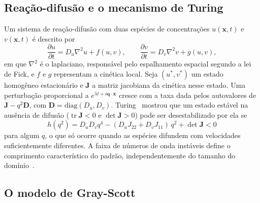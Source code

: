 \documentclass[final,5p,times,twocolumn]{elsarticle}
\begin{document}
\subsection{Reação-difusão e o mecanismo de Turing}\label{subsec:turing}

Um sistema de reação-difusão com duas espécies de concentrações $u(\mathbf{x},t)$ e $v(\mathbf{x},t)$ é descrito por
\begin{equation}\label{eq:rd}
\frac{\partial u}{\partial t} = D_u \nabla^2 u + f(u,v), \qquad
\frac{\partial v}{\partial t} = D_v \nabla^2 v + g(u,v),
\end{equation}
em que $\nabla^2$ é o laplaciano, responsável pelo espalhamento espacial segundo a lei de Fick, e $f$ e $g$ representam a cinética local. Seja $(u^*,v^*)$ um estado homogêneo estacionário e $\mathbf{J}$ a matriz jacobiana da cinética nesse estado. Uma perturbação proporcional a $e^{\lambda t+i\mathbf{q}\cdot\mathbf{x}}$ cresce com a taxa dada pelos autovalores de $\mathbf{J}-q^2\mathbf{D}$, com $\mathbf{D}=\mathrm{diag}(D_u,D_v)$. Turing~\cite{turing1952} mostrou que um estado estável na ausência de difusão ($\operatorname{tr}\mathbf{J}<0$ e $\det\mathbf{J}>0$) pode ser desestabilizado por ela se
\begin{equation}\label{eq:turing}
h(q^2)=D_uD_v q^4-(D_u J_{22} + D_v J_{11})\,q^2+\det\mathbf{J} < 0
\end{equation}
para algum $q$, o que só ocorre quando as espécies difundem com velocidades suficientemente diferentes. A faixa de números de onda instáveis define o comprimento característico do padrão, independentemente do tamanho do domínio~\cite{murray2003}.

\subsection{O modelo de Gray-Scott}\label{subsec:gsmodel}
\end{document}
